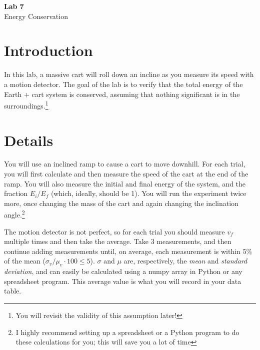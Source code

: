 \documentclass{article}
\begin{document}
\fancyfoot[C]{\thepage}
\vspace*{0cm}
\begin{center}
	{\LARGE \textbf{Lab 7}}\\
	\vspace{.25cm}
	{\Large Energy Conservation}
\end{center}

\section*{Introduction}
In this lab, a massive cart will roll down an incline as you measure its speed with a motion detector. The goal of the lab is to verify that the total energy of the Earth + cart system is conserved, assuming that nothing significant is in the surroundings.\footnote{You will revisit the validity of this assumption later!}

\section*{Details}
You will use an inclined ramp to cause a cart to move downhill. For each trial, you will first calculate and then measure the speed of the cart at the end of the ramp. You will also measure the initial and final energy of the system, and the fraction $E_i / E_f$ (which, ideally, should be 1). You will run the experiment twice more, once changing the mass of the cart and again changing the inclination angle.\footnote{I highly recommend setting up a spreadsheet or a Python program to do these calculations for you; this will save you a lot of time} 

The motion detector is not perfect, so for each trial you should measure $v_f$ multiple times and then take the average. Take 3 measurements, and then continue adding measurements until, on average, each measurement is within 5\% of the mean ($\sigma_v/\mu_v\cdot 100 \leq 5$). $\sigma$ and $\mu$ are, respectively, the \textit{mean} and \textit{standard deviation}, and can easily be calculated using a numpy array in Python or any spreadsheet program. This average value is what you will record in your data table.
\end{document}

